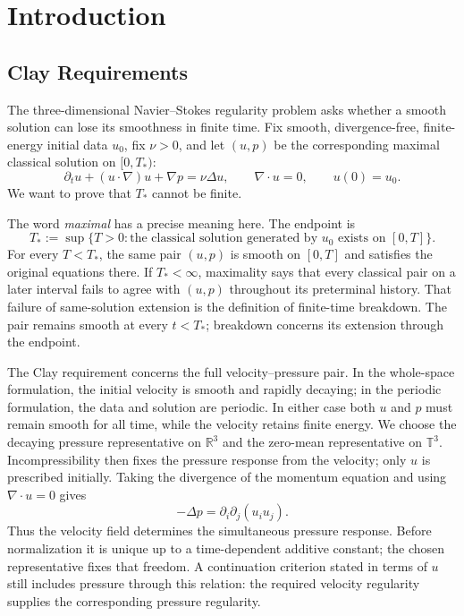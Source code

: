 \section{Introduction}

\subsection{Clay Requirements}

The three-dimensional Navier--Stokes regularity problem asks whether a smooth
solution can lose its smoothness in finite time.  Fix smooth,
divergence-free, finite-energy initial data \(u_0\), fix \(\nu>0\), and let
\((u,p)\) be the corresponding maximal classical solution on \([0,T_*)\):
\[
  \partial_tu+(u\cdot\nabla)u+\nabla p=\nu\Delta u,
  \qquad \nabla\cdot u=0,
  \qquad u(0)=u_0.
\]
We want to prove that \(T_*\) cannot be finite.

The word \emph{maximal} has a precise meaning here.  The endpoint is
\[
  T_*
  :=
  \sup\bigl\{
    T>0:
    \text{the classical solution generated by \(u_0\) exists on \([0,T]\)}
  \bigr\}.
\]
For every \(T<T_*\), the same pair \((u,p)\) is smooth on \([0,T]\) and
satisfies the original equations there.  If \(T_*<\infty\), maximality says
that every classical pair on a later interval fails to agree with \((u,p)\)
throughout its preterminal history.  That failure of same-solution extension
is the definition of finite-time breakdown.  The pair remains smooth at every
\(t<T_*\); breakdown concerns its extension through the endpoint.

The Clay requirement concerns the full velocity--pressure pair.  In the
whole-space formulation, the initial velocity is smooth and rapidly decaying;
in the periodic formulation, the data and solution are periodic.  In either
case both \(u\) and \(p\) must remain smooth for all time, while the velocity
retains finite energy.  We choose the decaying pressure representative on
\(\mathbb R^3\) and the zero-mean representative on \(\mathbb T^3\).
Incompressibility then fixes the pressure response from the velocity; only
\(u\) is prescribed initially.  Taking the divergence of the momentum equation
and using \(\nabla\cdot u=0\) gives
\[
  -\Delta p=\partial_i\partial_j(u_i u_j).
\]
Thus the velocity field determines the simultaneous pressure response.  Before
normalization it is unique up to a time-dependent additive constant; the chosen
representative fixes that freedom.  A continuation criterion stated in terms
of \(u\) still includes pressure through this relation: the required velocity
regularity supplies the corresponding pressure regularity.

